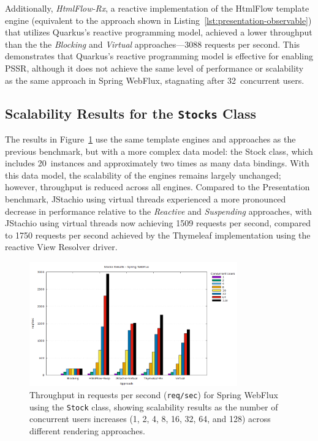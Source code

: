 \documentclass[software,article,accept,pdftex,moreauthors]{Definitions/mdpi}
\begin{document}
Additionally, \textit{HtmlFlow-Rx}, a reactive implementation of the HtmlFlow
template engine (equivalent to the approach shown in
Listing~\ref{lst:presentation-observable}) that utilizes Quarkus's reactive
programming model, achieved a lower throughput than the the \textit{Blocking}
and \textit{Virtual} approaches---3088 requests per second. This demonstrates
that Quarkus's reactive programming model is effective for enabling PSSR\@,
although it does not achieve the same level of performance or scalability as
the same approach in Spring WebFlux, stagnating after 32~concurrent users.

\subsection{Scalability Results for the \texttt{Stocks} Class} \label{sec:stocks-results}



The results in Figure~\ref{fig:stocks-webflux-jmeter} use the same template
engines and approaches as the previous benchmark, but with a more complex data
model: the Stock class, which includes 20~instances and approximately two times
as many data bindings. With this data model, the scalability of the engines
remains largely unchanged; however, throughput is reduced across all engines.
Compared to the Presentation benchmark, JStachio using virtual threads
experienced a more pronounced decrease in performance relative to the
\textit{Reactive} and \textit{Suspending} approaches, with JStachio using
virtual threads now achieving 1509 requests per second, compared to 1750
requests per second achieved by the Thymeleaf implementation using the reactive
View Resolver driver.

\begin{figure}[H]
\vspace{-6pt}
     \includegraphics[width=0.8\textwidth]{./Graphs/stocks-webflux-jmeter.png}
     \caption{Throughput in requests per second (\texttt{req/sec}) for Spring
WebFlux using the \texttt{Stock} class, showing scalability results as
the number of concurrent users increases (1, 2, 4, 8, 16, 32, 64, and 128)
across different rendering approaches.}
\label{fig:stocks-webflux-jmeter}
\end{figure}
\end{document}
